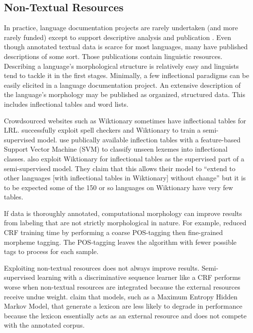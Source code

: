 \documentclass[12pt]{article}
\begin{document}
\subsection{Non-Textual Resources}

In practice, language documentation projects are rarely undertaken (and more rarely funded) except to support descriptive analysis and publication \cite{thieberger_using_2012,austin_language_2014,vallejos_integrating_2014,thieberger_assessing_2016}. Even though annotated textual data is scarce for most languages, many have published descriptions of some sort. Those publications contain linguistic resources. Describing a language's morphological structure is relatively easy \cite{roark_computational_2007} and linguists tend to tackle it in the first stages. Minimally, a few inflectional paradigms can be easily elicited in a language documentation project. An extensive description of the language’s morphology may be published as organized, structured data. This includes inflectional tables and word lists.

Crowdsourced websites such as Wiktionary sometimes have inflectional tables for LRL.  successfully exploit spell checkers and Wiktionary to train a semi-supervised model.  use publically available inflection tables with a feature-based Support Vector Machine (SVM) to classify unseen lexemes into inflectional classes.  also exploit Wiktionary for inflectional tables as the supervised part of a semi-supervised model. They claim that this allows their model to ``extend to other languages [with inflectional tables in Wiktionary] without change'' but it is to be expected some of the 150 or so languages on Wiktionary have very few tables. 

If data is thoroughly annotated, computational morphology can improve results from labeling that are not strictly morphological in nature. For example,  reduced CRF training time by performing a coarse POS-tagging then fine-grained morpheme tagging. The POS-tagging leaves the algorithm with fewer possible tags to process for each sample. 

Exploiting non-textual resources does not always improve results. Semi-supervised learning with a discriminative sequence learner like a CRF performs worse when non-textual resources are integrated because the external resources receive undue weight.  claim that models, such as a Maximum Entropy Hidden Markov Model, that generate a lexicon are less likely to degrade in performance because the lexicon essentially acts as an external resource and does not compete with the annotated corpus. 
\end{document}
